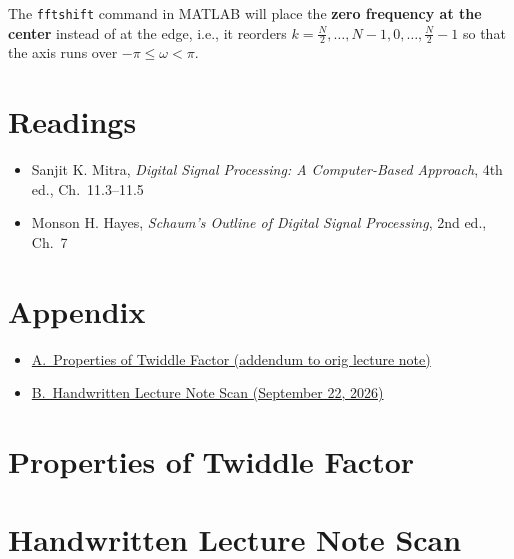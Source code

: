 \documentclass[handout_subfiles_root.tex]{subfiles}
\begin{document}
\begin{notebox}[title={Note}]
The \texttt{fftshift} command in MATLAB will place the \textbf{zero frequency at the center} instead of at the edge, i.e., it reorders $k=\tfrac{N}{2},\dots,N-1,0,\dots,\tfrac{N}{2}-1$ so that the axis runs over $-\pi\le\omega<\pi$.
\end{notebox}

\section*{Readings}
\begin{itemize}
  \item Sanjit K. Mitra, \textit{Digital Signal Processing: A Computer-Based Approach}, 4th ed., Ch.\ 11.3--11.5
  \item Monson H. Hayes, \textit{Schaum's Outline of Digital Signal Processing}, 2nd ed., Ch.\ 7
\end{itemize}

\clearpage
\begingroup
\renewcommand{\thesection}{\Alph{section}}%
\renewcommand{\theHsection}{lec9appendix.\Alph{section}}%
\setcounter{section}{0}%
\section*{Appendix}
\begin{itemize}[leftmargin=1.5em, itemsep=3pt]
  \item \hyperref[app:twiddle]{A.\ Properties of Twiddle Factor (addendum to orig lecture note)}
\ifhandoutclean\else
  \item \hyperref[app:scan9]{B.\ Handwritten Lecture Note Scan (September 22, 2026)}
\fi
\end{itemize}
\vspace{0.75em}

\section{Properties of Twiddle Factor}
\label{app:twiddle}


\ifhandoutclean\else
\clearpage
\section{Handwritten Lecture Note Scan}
\label{app:scan9}
\fi
\endgroup
\end{document}
